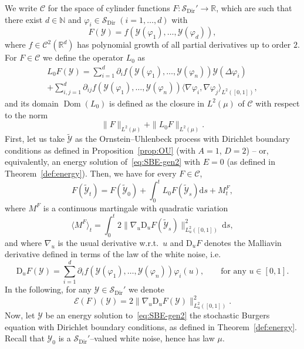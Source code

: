\documentclass[10pt]{amsart}
\theoremstyle{definition}\newtheorem{defi}[theo]{Definition}\newtheorem{rema}[theo]{Remark}\newtheorem{exam}[theo]{Example}\newtheorem{exem}[theo]{Example}\newtheorem{nota}[theo]{Notation}
\DeclareMathOperator{\Dir}{Dir}
\DeclareMathOperator{\Dom}{Dom}
\newcommand{\bb}[1]{{\mathbb #1}}
\newcommand{\mc}[1]{{\mathcal #1}}
\renewcommand{\mc}[1]{{\mathcal #1}}
\newcommand{\SD}{\ensuremath{\mc S_{\Dir}}}
\renewcommand{\tilde}{\widetilde}
\newcommand*{\dd}{\mathrm{d}}
\newcommand*{\ds}{\dd s}
\begin{document}
We write $\mathcal{C}$ for the space of cylinder functions $F\colon \SD' \rightarrow \mathbb{R}$, which are such that there exist $d \in \bb N$ and $\varphi_i \in \SD \; (i=1,\dots,d)$ with
\[
F (\mc{Y})= f (\mc{Y} (\varphi_1),
\ldots, \mc{Y} (\varphi_d)),
\]
where $f \in \mc C^2 (\mathbb{R}^d)$ has polynomial growth of all partial derivatives up to order $2$. For $F \in \mathcal{C}$ we define the operator $L_0$ as
\begin{multline*}
L_0 F (\mc Y) = \sum_{i = 1}^d \partial_i f (\mc Y (\varphi_1), \ldots, \mc Y (\varphi_n)) \mc Y (\Delta \varphi_i) \\
+ \sum_{i, j = 1}^d \partial_{i j} f (\mc Y (\varphi_1), \ldots, \mc Y (\varphi_n)) \langle \nabla \varphi_i, \nabla
\varphi_j \rangle_{L^2 ([0, 1])},
\end{multline*}
and its domain $\Dom (L_0)$ is defined as the closure in $L^2(\mu)$ of $\mathcal{C}$ with respect to the norm
\[
\| F \|_{L^2 (\mu)} + \| L_0 F \|_{L^2 (\mu)}.
\]
First, let us take $\tilde{\mc Y}$ as the Ornstein--Uhlenbeck process with Dirichlet boundary conditions as defined in Proposition~\ref{prop:OU} (with $A=1$, $D=2$) -- or, equivalently, an energy solution of~\eqref{eq:SBE-gen2} with $E=0$ (as defined in Theorem~\ref{def:energy}). Then, we have for every $F \in \mathcal{C}$,
\[
F (\tilde{\mc Y}_t) = F (\tilde{\mc Y}_0) + \int_0^t L_0 F (\tilde{\mc Y}_s) \ds + M^F_t,
\]
where $M^F$ is a continuous martingale with quadratic variation
\[
\langle M^F \rangle_t = \int_0^t 2 \big\| \nabla_u \mathrm{D}_u F (\tilde{\mc Y}_s)
\big\|_{{L^2_u([0,1])}}^2 \,\ds,
\]
and where $\nabla_u$ is the usual derivative w.r.t.~$u$ and $\mathrm{D}_u F$ denotes the Malliavin derivative defined in terms of the law of the white noise, i.e.
\[
\mathrm{D}_u F (\mc Y)= \sum_{i = 1}^d \partial_i f (\mc Y (\varphi_1), \ldots, \mc Y (\varphi_n)) \varphi_i (u), \qquad \text{for any } u \in [0, 1].
\]
In the following, for any $\mc Y \in \SD'$ we denote
\begin{equation}\label{eq:E-def}
\mathcal{E} (F) (\mc Y)= 2 \big\| \nabla_u \mathrm{D}_u F (\mc Y)
\big\|_{{L^2_u([0,1])}}^2.
\end{equation}
Now, let $\mc Y$ be an energy solution to~\eqref{eq:SBE-gen2} the stochastic Burgers equation with Dirichlet boundary conditions, as defined in Theorem~\ref{def:energy}. Recall that $\mc Y_0$ is a $\SD'$--valued white noise, hence has law $\mu$.
\end{document}
